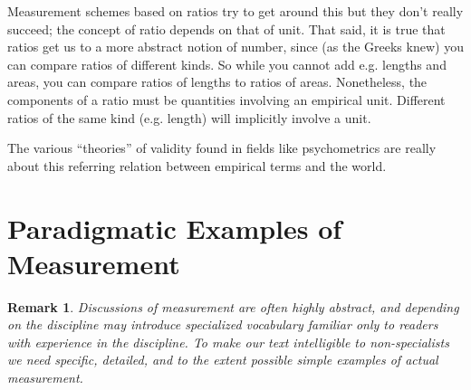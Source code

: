 \documentclass[11pt,twoside]{article}
\newtheorem{remark}{Remark}
\begin{document}
Measurement schemes based on ratios try to get around this but they
don't really succeed; the concept of ratio depends on that of unit.
That said, it is true that ratios get us to a more abstract notion of
number, since (as the Greeks knew) you can compare ratios of different
kinds.  So while you cannot add e.g. lengths and areas, you can
compare ratios of lengths to ratios of areas.  Nonetheless, the
components of a ratio must be quantities involving an empirical unit.
Different ratios of the same kind (e.g. length) will implicitly
involve a unit.

The various ``theories'' of validity found in fields like
psychometrics are really about this referring relation between
empirical terms and the world.  

\section{Paradigmatic Examples of Measurement}

\begin{remark}
Discussions of measurement are often highly abstract, and depending on
the discipline may introduce specialized vocabulary familiar only to
readers with experience in the discipline.  To make our text
intelligible to non-specialists we need specific, detailed, and to the
extent possible simple examples of actual measurement.
\end{remark}
\end{document}
